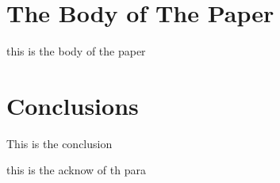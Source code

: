 \documentclass[sigconf]{acmart}
\begin{document}
\section{The Body of The Paper}

this is the body of the paper



\section{Conclusions}

This is the conclusion



\appendix








\begin{acks}

  this is the acknow of th para

\end{acks}


 
\end{document}

